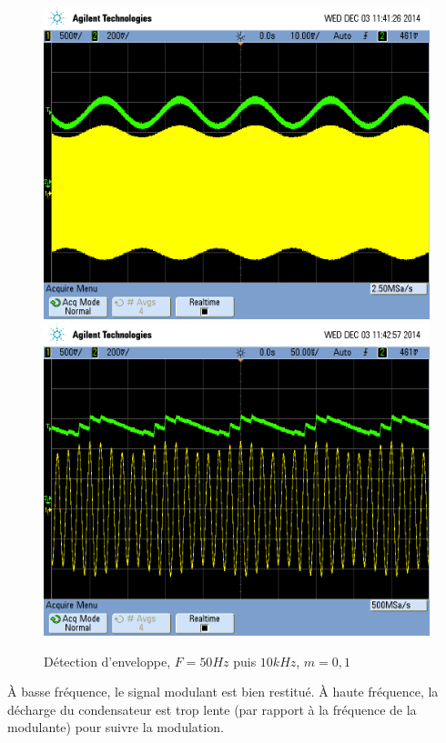 \documentclass[../../Cours_M1.tex]{subfiles}
\begin{document}
\begin{figure}[h!]
\centering
\includegraphics[scale=0.2]{DEBF.png}
\includegraphics[scale=0.2]{DEHF.png}
\caption{Détection d'enveloppe, $F=50Hz$ puis $10kHz$, $m=0,1$}
\end{figure}

À basse fréquence, le signal modulant est bien restitué. À haute fréquence, la décharge du condensateur est trop lente (par rapport à la fréquence de la modulante) pour suivre la modulation.
\end{document}
